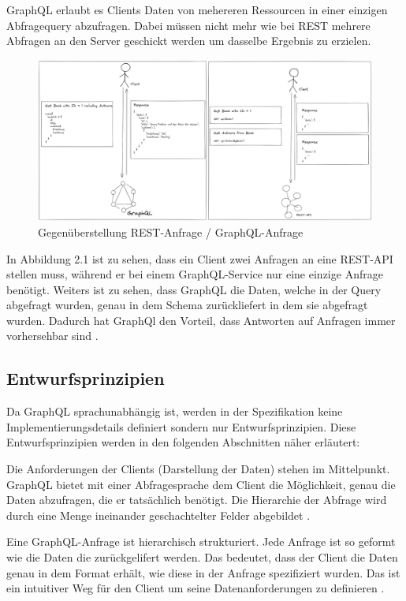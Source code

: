GraphQL erlaubt es Clients Daten von mehereren Ressourcen in einer einzigen Abfragequery abzufragen.
Dabei müssen nicht mehr wie bei REST mehrere Abfragen an den Server geschickt werden um dasselbe Ergebnis zu erzielen.

\begin{figure}[H]
    \centering
    \includegraphics[width=\textwidth]{pics/graphql_rest_request.png}
    \caption{Gegenüberstellung REST-Anfrage / GraphQL-Anfrage}
\end{figure}

In Abbildung 2.1 ist zu sehen, dass ein Client zwei Anfragen an eine REST-API stellen muss, während er bei einem GraphQL-Service nur eine einzige Anfrage benötigt.
Weiters ist zu sehen, dass GraphQL die Daten, welche in der Query abgefragt wurden, genau in dem Schema zurückliefert in dem sie abgefragt wurden.
Dadurch hat GraphQl den Vorteil, dass Antworten auf Anfragen immer vorhersehbar sind \cite[Abs. Basics of a GraphQL API]{rakutenGraphQLVsRest}.

\subsection{Entwurfsprinzipien}
Da GraphQL sprachunabhängig ist, werden in der Spezifikation keine Implementierungsdetails definiert sondern nur Entwurfsprinzipien.
Diese Entwurfsprinzipien werden in den folgenden Abschnitten näher erläutert:

Die Anforderungen der Clients (Darstellung der Daten) stehen im Mittelpunkt.
GraphQL bietet mit einer Abfragesprache dem Client die Möglichkeit, genau die Daten abzufragen, die er tatsächlich benötigt. Die Hierarchie der
Abfrage wird durch eine Menge ineinander geschachtelter Felder abgebildet \cite[Abs. 1]{graphqlOnline}.

Eine GraphQL-Anfrage ist hierarchisch strukturiert.
Jede Anfrage ist so geformt wie die Daten die zurückgelifert werden.
Das bedeutet, dass der Client die Daten genau in dem Format erhält, wie diese in der Anfrage spezifiziert wurden.
Das ist ein intuitiver Weg für den Client um seine Datenanforderungen zu definieren \cite[Abs. 1]{graphqlOnline}.

